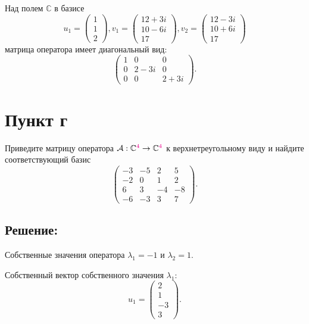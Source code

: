 \documentclass[12pt]{article}
\begin{document}
    Над полем $\mathbb{C}$ в базисе
    \[
        u_1 = \begin{pmatrix}
                  1 \\ 1 \\ 2
        \end{pmatrix},
        v_1 = \begin{pmatrix}
                  12 + 3i \\ 10 - 6i \\ 17
        \end{pmatrix},
        v_2 = \begin{pmatrix}
                  12 - 3i \\ 10 + 6i \\ 17
        \end{pmatrix}
    \]
    матрица оператора имеет диагональный вид:
    \[
        \begin{pmatrix}
            1 & 0      & 0      \\
            0 & 2 - 3i & 0      \\
            0 & 0      & 2 + 3i
        \end{pmatrix}
        .
    \]

    \section*{Пункт г}
    Приведите матрицу оператора $\mathcal{A}: \mathbb{C}^{\textcolor{magenta}{4}} \rightarrow \mathbb{C}^{\textcolor{magenta}{4}}$ к верхнетреугольному виду и найдите соответствующий базис
    \[
        \begin{pmatrix}
            -3 & -5 & 2  & 5  \\
            -2 & 0  & 1  & 2  \\
            6  & 3  & -4 & -8 \\
            -6 & -3 & 3  & 7
        \end{pmatrix}
        .
    \]

    \subsection*{Решение:}
    Собственные значения оператора $\lambda_1 = -1$ и $\lambda_2 = 1$.

    Собственный вектор собственного значения $\lambda_1$:
    \[
        u_1 = \begin{pmatrix}
                  2 \\ 1 \\ -3 \\ 3
        \end{pmatrix}
        .
    \]
\end{document}
